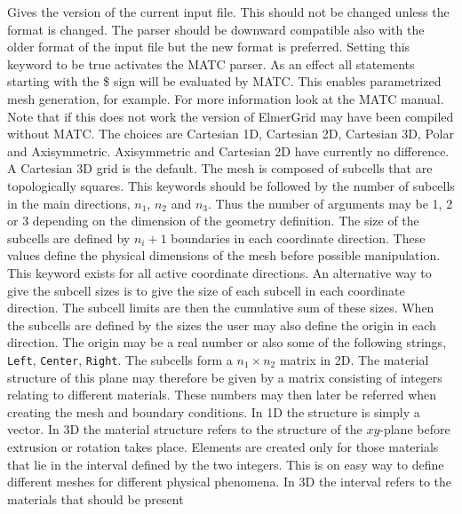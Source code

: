 \sifbegin
{}
Gives the version of the current input file. This should not be changed unless
the format is changed. The parser should be downward compatible also with the older
format of the input file but the new format is preferred.
%
Setting this keyword to be true activates the MATC parser. As an effect all statements 
starting with the \$ sign will be evaluated by MATC. This enables parametrized mesh generation,
for example. For more information look at the MATC manual. Note that if this does not work the 
version of ElmerGrid may have been compiled without MATC. 
%
The choices are Cartesian 1D, Cartesian 2D, Cartesian 3D, Polar and 
Axisymmetric. Axisymmetric and Cartesian 2D have currently
no difference.
A Cartesian 3D grid is the default.
%
The mesh is composed of subcells that are 
topologically squares. 
This keywords should be followed by the 
number of subcells in the main directions,
$n_1$, $n_2$ and $n_3$.
Thus the number of 
arguments may be 1, 2 or 3 depending on the dimension of the geometry 
definition. 
The size of the subcells are defined by $n_i+1$ boundaries
in each coordinate direction. These values define the physical 
dimensions of the mesh before possible manipulation. 
This keyword exists for all active coordinate directions.  
%
An alternative way to give the subcell sizes is to give the size of 
each subcell in each coordinate direction. 
The subcell limits are then the cumulative sum of these sizes.
%
When the subcells are defined by the sizes the user may also define the origin 
in each direction. The origin may be a real number or also some of the following 
strings, \texttt{Left}, \texttt{Center}, \texttt{Right}.
%
The subcells form a $n_1 \times n_2$ matrix in 2D. 
The material structure of this plane may therefore be given by a matrix 
consisting of integers relating to different materials.
These numbers may then later be referred
when creating the mesh and boundary conditions.
In 1D the structure is simply a vector.
In 3D the material structure refers to the structure of the 
$xy$-plane before extrusion or rotation takes place. 
%
Elements are created only for those materials that 
lie in the interval defined by the two integers.
This is on easy way to define different meshes for different physical
phenomena.
In 3D the interval refers to the materials that should be present
